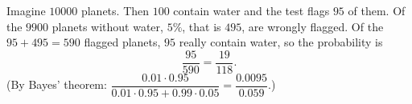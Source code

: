 Imagine $10000$ planets. Then $100$ contain water and the test flags $95$ of them. Of the $9900$ planets without water, $5\%$, that is $495$, are wrongly flagged. Of the $95+495=590$ flagged planets, $95$ really contain water, so the probability is
\[
\dfrac{95}{590}=\boxed{\dfrac{19}{118}} .
\]
(By Bayes' theorem: $\dfrac{0.01\cdot0.95}{0.01\cdot0.95+0.99\cdot0.05}=\dfrac{0.0095}{0.059}$.)
